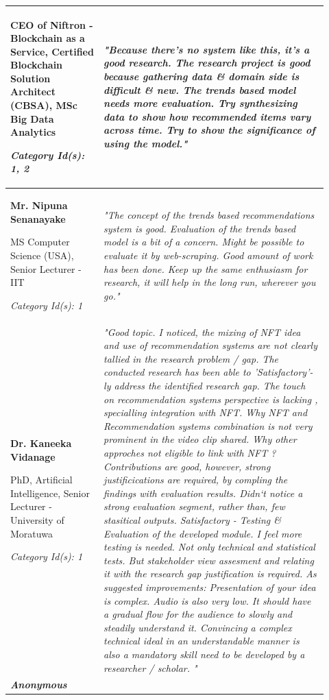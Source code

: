 \begin{longtable}{|p{0.27\linewidth}|p{0.655\linewidth}|}
CEO of Niftron - Blockchain as a Service, Certified Blockchain Solution Architect (CBSA), MSc Big Data Analytics

\textit{Category Id(s): 1, 2}
&  
\textit{"Because there's no system like this, it's a good research. The research project is good because gathering data \& domain side is difficult \& new.
The trends based model needs more evaluation. Try synthesizing data to show how recommended items vary across time. Try to show the significance of using the model."}
\\
\hline
\textbf{Mr. Nipuna Senanayake} 

MS Computer Science (USA), Senior Lecturer - IIT

\textit{Category Id(s): 1}
& 
\textit{"The concept of the trends based recommendations system is good. Evaluation of the trends based model is a bit of a concern. Might be possible to evaluate it by web-scraping.
Good amount of work has been done. Keep up the same enthusiasm for research, it will help in the long run, wherever you go."}
 \\
\hline
\textbf{Dr. Kaneeka Vidanage}

PhD, Artificial Intelligence, Senior Lecturer - University of Moratuwa

\textit{Category Id(s): 1}
& 
\textit{"Good topic. I noticed, the mixing of NFT idea and use of recommendation systems are not clearly tallied in the research problem / gap.
The conducted research has been able to 'Satisfactory'-ly address the identified research gap. The touch on recommendation systems perspective is lacking , specialling integration with NFT.
Why NFT and Recommendation systems combination is not very prominent in the video clip shared. Why other approches not eligible to link with NFT ?
Contributions are good, however, strong justificications are required, by compling the findings with evaluation results. Didn`t notice a strong evaluation segment, rather than, few stasitical outputs.
Satisfactory - Testing \& Evaluation of the developed module. I feel more testing is needed. Not only technical and statistical tests. But stakeholder view assesment and relating it with the research gap justification is required.
As suggested improvements: Presentation of your idea is complex. Audio is also very low.  It should have a gradual flow for the audience to slowly and steadily understand it. Convincing a complex technical ideal in an understandable manner is also a mandatory skill need to be developed by a researcher / scholar. 
"}
\\
\hline
\textbf{\textit{Anonymous}}


\end{longtable}
